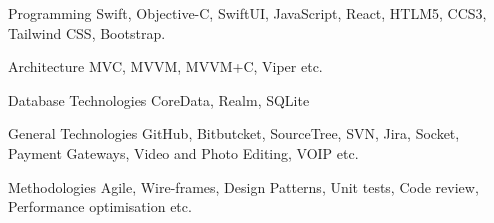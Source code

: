 


\begin{cvskills}


\cvskill
{Programming} %
{Swift, Objective-C,  SwiftUI, JavaScript, React, HTLM5, CCS3, Tailwind CSS, Bootstrap.} %


\cvskill
{Architecture} %
{MVC, MVVM, MVVM+C, Viper etc.} %


\cvskill
{Database Technologies} %
{CoreData, Realm, SQLite} %


\cvskill
{General Technologies} %
{GitHub, Bitbutcket, SourceTree, SVN, Jira, Socket, Payment Gateways, Video and Photo Editing, VOIP etc.} %


\cvskill
{Methodologies} %
{Agile, Wire-frames, Design Patterns, Unit tests, Code review, Performance optimisation etc.} %


\end{cvskills}